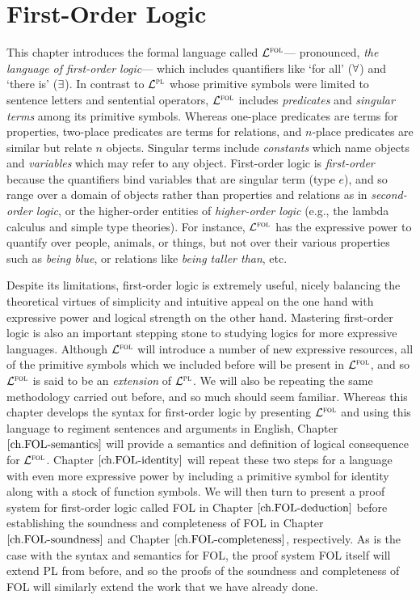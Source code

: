 \chapter{First-Order Logic}
  \label{ch.FOL-syntax}

This chapter introduces the formal language called $\mathcal{L}^{\textsc{fol}}$--- pronounced, \textit{the language of first-order logic}--- which includes quantifiers like `for all' ($\forall$) and `there is' ($\exists$).
In contrast to $\mathcal{L}^{\textsc{pl}}$ whose primitive symbols were limited to sentence letters and sentential operators, $\mathcal{L}^{\textsc{fol}}$ includes \textit{predicates} and \textit{singular terms} among its primitive symbols.
Whereas one-place predicates are terms for properties, two-place predicates are terms for relations, and $n$-place predicates are similar but relate $n$ objects.
Singular terms include \textit{constants} which name objects and \textit{variables} which may refer to any object.
First-order logic is \textit{first-order} because the quantifiers bind variables that are singular term (type $e$), and so range over a domain of objects rather than properties and relations as in \textit{second-order logic}, or the higher-order entities of \textit{higher-order logic} (e.g., the lambda calculus and simple type theories).
For instance, $\mathcal{L}^{\textsc{fol}}$ has the expressive power to quantify over people, animals, or things, but not over their various properties such as \textit{being blue}, or relations like \textit{being taller than}, etc.

Despite its limitations, first-order logic is extremely useful, nicely balancing the theoretical virtues of simplicity and intuitive appeal on the one hand with expressive power and logical strength on the other hand.
Mastering first-order logic is also an important stepping stone to studying logics for more expressive languages.
Although $\mathcal{L}^{\textsc{fol}}$ will introduce a number of new expressive resources, all of the primitive symbols which we included before will be present in $\mathcal{L}^{\textsc{fol}}$, and so $\mathcal{L}^{\textsc{fol}}$ is said to be an \textit{extension} of $\mathcal{L}^{\textsc{pl}}$. 
We will also be repeating the same methodology carried out before, and so much should seem familiar.
Whereas this chapter develops the syntax for first-order logic by presenting $\mathcal{L}^{\textsc{fol}}$ and using this language to regiment sentences and arguments in English, Chapter $\ref{ch.FOL-semantics}$ will provide a semantics and definition of logical consequence for $\mathcal{L}^{\textsc{fol}}$.
Chapter $\ref{ch.FOL-identity}$ will repeat these two steps for a language with even more expressive power by including a primitive symbol for identity along with a stock of function symbols.
We will then turn to present a proof system for first-order logic called FOL in Chapter $\ref{ch.FOL-deduction}$ before establishing the soundness and completeness of FOL in Chapter $\ref{ch.FOL-soundness}$ and Chapter $\ref{ch.FOL-completeness}$, respectively.
As is the case with the syntax and semantics for FOL, the proof system FOL itself will extend PL from before, and so the proofs of the soundness and completeness of FOL will similarly extend the work that we have already done.





